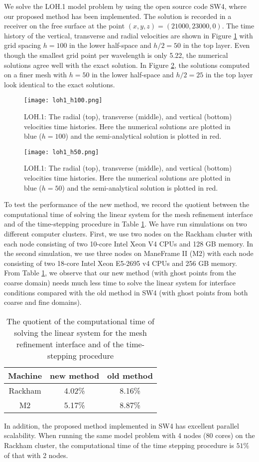 We solve the LOH.1 model problem by using the open source code SW4, where our proposed method has been implemented. The solution is recorded in a receiver on the free surface at the point $(x, y, z) = (21000, 23000, 0)$. The time history of the vertical, transverse and radial velocities are shown in Figure \ref{loh1_100} with grid spacing $h = 100$ in the lower half-space and $h/2 = 50$ in the top layer. Even though the smallest grid point per wavelength is only 5.22, the numerical solutions agree well with the exact solution. In Figure \ref{loh1_50}, the solutions computed on a finer mesh with $h = 50$ in the lower half-space and $h/2 = 25$ in the top layer look identical to the exact solutions.
\begin{figure}[htbp]
	\centering
	\texttt{[image: loh1\_h100.png]}
	\caption{LOH.1: The radial (top), transverse (middle), and vertical (bottom) velocities time histories. Here the numerical solutions are plotted in blue ($h = 100$) and the semi-analytical solution is plotted in red.}\label{loh1_100}
\end{figure}

\begin{figure}[htbp]
	\centering
	\texttt{[image: loh1\_h50.png]}
	\caption{LOH.1: The radial (top), transverse (middle), and vertical (bottom) velocities time histories. Here the numerical solutions are plotted in blue ($h = 50$) and the semi-analytical solution is plotted in red.}\label{loh1_50}
\end{figure}

To test the performance of the new method, we record the quotient between the computational time of solving the linear system for the mesh refinement interface and of the time-stepping procedure in Table \ref{time}. We have run simulations on two different computer clusters. First, we use two nodes on the Rackham cluster with each node consisting of two 10-core Intel Xeon V4 CPUs and 128 GB memory. In the second simulation, we use three nodes on ManeFrame II (M2) with each node consisting of two 18-core Intel Xeon E5-2695 v4 CPUs and 256 GB memory. From Table \ref{time}, we observe that our new method (with ghost points from the coarse domain) needs much less time to solve the linear system for interface conditions compared with the old method in SW4 (with ghost points from both coarse and fine domains). 

\begin{table}[htbp]
	\begin{center}
		\begin{tabular}{|c|c|c|}
			\hline
			Machine   & new method & old method \\
			\hline
			Rackham & 4.02\% &  8.16\%\\
			\hline
			M2 &5.17\% & 8.87\%\\
			\hline 
		\end{tabular}
	\end{center}
		\caption{The quotient of the computational time of solving the linear system for the mesh refinement interface and of the time-stepping procedure}\label{time}
\end{table} 

In addition, the proposed method implemented in SW4 has excellent parallel scalability. When running the same model problem with 4 nodes (80 cores) on the Rackham cluster, the computational time of the time stepping procedure is $51\%$ of that with 2 nodes. 
